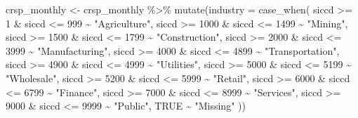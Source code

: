 \documentclass[
]{krantz}
\newenvironment{Shaded}{\begin{snugshade}}{\end{snugshade}}
\newcommand{\AttributeTok}[1]{\textcolor[rgb]{0.61,0.61,0.61}{#1}}
\newcommand{\ConstantTok}[1]{\textcolor[rgb]{0,0,0}{#1}}
\newcommand{\DecValTok}[1]{\textcolor[rgb]{0.06,0.06,0.06}{#1}}
\newcommand{\FunctionTok}[1]{\textcolor[rgb]{0,0,0}{#1}}
\newcommand{\NormalTok}[1]{#1}
\newcommand{\OtherTok}[1]{\textcolor[rgb]{0.37,0.37,0.37}{#1}}
\newcommand{\SpecialCharTok}[1]{\textcolor[rgb]{0,0,0}{#1}}
\newcommand{\StringTok}[1]{\textcolor[rgb]{0.5,0.5,0.5}{#1}}
\begin{document}
\begin{Shaded}
\begin{Highlighting}[]
\NormalTok{crsp\_monthly }\OtherTok{\textless{}{-}}\NormalTok{ crsp\_monthly }\SpecialCharTok{\%\textgreater{}\%}
  \FunctionTok{mutate}\NormalTok{(}\AttributeTok{industry =} \FunctionTok{case\_when}\NormalTok{(}
\NormalTok{    siccd }\SpecialCharTok{\textgreater{}=} \DecValTok{1} \SpecialCharTok{\&}\NormalTok{ siccd }\SpecialCharTok{\textless{}=} \DecValTok{999} \SpecialCharTok{\textasciitilde{}} \StringTok{"Agriculture"}\NormalTok{,}
\NormalTok{    siccd }\SpecialCharTok{\textgreater{}=} \DecValTok{1000} \SpecialCharTok{\&}\NormalTok{ siccd }\SpecialCharTok{\textless{}=} \DecValTok{1499} \SpecialCharTok{\textasciitilde{}} \StringTok{"Mining"}\NormalTok{,}
\NormalTok{    siccd }\SpecialCharTok{\textgreater{}=} \DecValTok{1500} \SpecialCharTok{\&}\NormalTok{ siccd }\SpecialCharTok{\textless{}=} \DecValTok{1799} \SpecialCharTok{\textasciitilde{}} \StringTok{"Construction"}\NormalTok{,}
\NormalTok{    siccd }\SpecialCharTok{\textgreater{}=} \DecValTok{2000} \SpecialCharTok{\&}\NormalTok{ siccd }\SpecialCharTok{\textless{}=} \DecValTok{3999} \SpecialCharTok{\textasciitilde{}} \StringTok{"Manufacturing"}\NormalTok{,}
\NormalTok{    siccd }\SpecialCharTok{\textgreater{}=} \DecValTok{4000} \SpecialCharTok{\&}\NormalTok{ siccd }\SpecialCharTok{\textless{}=} \DecValTok{4899} \SpecialCharTok{\textasciitilde{}} \StringTok{"Transportation"}\NormalTok{,}
\NormalTok{    siccd }\SpecialCharTok{\textgreater{}=} \DecValTok{4900} \SpecialCharTok{\&}\NormalTok{ siccd }\SpecialCharTok{\textless{}=} \DecValTok{4999} \SpecialCharTok{\textasciitilde{}} \StringTok{"Utilities"}\NormalTok{,}
\NormalTok{    siccd }\SpecialCharTok{\textgreater{}=} \DecValTok{5000} \SpecialCharTok{\&}\NormalTok{ siccd }\SpecialCharTok{\textless{}=} \DecValTok{5199} \SpecialCharTok{\textasciitilde{}} \StringTok{"Wholesale"}\NormalTok{,}
\NormalTok{    siccd }\SpecialCharTok{\textgreater{}=} \DecValTok{5200} \SpecialCharTok{\&}\NormalTok{ siccd }\SpecialCharTok{\textless{}=} \DecValTok{5999} \SpecialCharTok{\textasciitilde{}} \StringTok{"Retail"}\NormalTok{,}
\NormalTok{    siccd }\SpecialCharTok{\textgreater{}=} \DecValTok{6000} \SpecialCharTok{\&}\NormalTok{ siccd }\SpecialCharTok{\textless{}=} \DecValTok{6799} \SpecialCharTok{\textasciitilde{}} \StringTok{"Finance"}\NormalTok{,}
\NormalTok{    siccd }\SpecialCharTok{\textgreater{}=} \DecValTok{7000} \SpecialCharTok{\&}\NormalTok{ siccd }\SpecialCharTok{\textless{}=} \DecValTok{8999} \SpecialCharTok{\textasciitilde{}} \StringTok{"Services"}\NormalTok{,}
\NormalTok{    siccd }\SpecialCharTok{\textgreater{}=} \DecValTok{9000} \SpecialCharTok{\&}\NormalTok{ siccd }\SpecialCharTok{\textless{}=} \DecValTok{9999} \SpecialCharTok{\textasciitilde{}} \StringTok{"Public"}\NormalTok{,}
    \ConstantTok{TRUE} \SpecialCharTok{\textasciitilde{}} \StringTok{"Missing"}
\NormalTok{  ))}
\end{Highlighting}
\end{Shaded}
\end{document}
